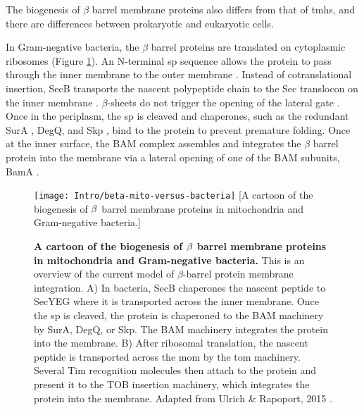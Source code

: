 The biogenesis of $\beta$ barrel membrane proteins also differs from that of \gls{tmh}s, and there are differences between prokaryotic and eukaryotic cells.

In Gram\--negative bacteria, the $\beta$ barrel proteins are translated on cytoplasmic ribosomes (Figure \ref{fig:beta-mito-versus-bacteria}).
An N-terminal \gls{sp} sequence allows the protein to pass through the inner membrane to the outer membrane \cite{Driessen2008, Papanikou2007}.
Instead of cotranslational insertion, SecB transports the nascent polypeptide chain to the Sec translocon on the inner membrane \cite{Bechtluft2010}.
$\beta$\--sheets do not trigger the opening of the lateral gate \cite{Ulrich2015}.
Once in the periplasm, the \gls{sp} is cleaved \cite{Paetzel2014} and chaperones, such as the redundant SurA \cite{Lazar1996, Volokhina2011}, DegQ, and Skp \cite{Volokhina2011}, bind to the protein to prevent premature folding.
Once at the inner surface, the BAM complex assembles and integrates the $\beta$ barrel protein into the membrane \cite{Wu2005, Hagan2010} via a lateral opening of one of the BAM subunits, BamA \cite{Noinaj2014}.

\begin{figure}[ht]
\centering
\texttt{[image: Intro/beta-mito-versus-bacteria]}
		[A cartoon of the biogenesis of $\protect\beta$ barrel membrane proteins in mitochondria and Gram\--negative bacteria.]{\textbf{A cartoon of the biogenesis of $\protect\beta$ barrel membrane proteins in mitochondria and Gram\--negative bacteria.}
		This is an overview of the current model of $\beta$\--barrel protein membrane integration.
		A) In bacteria, SecB chaperones the nascent peptide to SecYEG where it is transported across the inner membrane.
		Once the \gls{sp} is cleaved, the protein is chaperoned to the BAM machinery by SurA, DegQ, or Skp.
		The BAM machinery integrates the protein into the membrane.
		B) After ribosomal translation, the nascent peptide is transported across the \gls{mom} by the \gls{tom} machinery.
		Several Tim recognition molecules then attach to the protein and present it to the TOB insertion machinery, which integrates the protein into the membrane.
		Adapted from Ulrich \& Rapoport, 2015 \cite{Ulrich2015}.

		}
\label{fig:beta-mito-versus-bacteria}
\end{figure}

